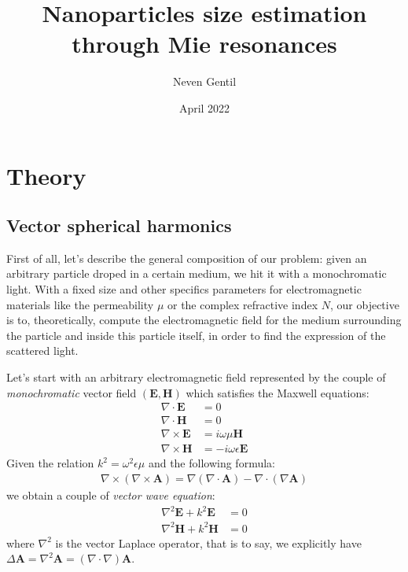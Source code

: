 \documentclass{article}
\title{Nanoparticles size estimation through Mie resonances}
\author{Neven Gentil}
\date{April 2022}
\numberwithin{equation}{section}
\begin{document}
\maketitle

\twocolumn

\section{Theory}

\subsection{Vector spherical harmonics}

First of all, let's describe the general composition of our problem: given an arbitrary particle droped in a certain medium, we hit it with a monochromatic light. With a fixed size and other specifics parameters for electromagnetic materials like the permeability $\mu$ or the complex refractive index $N$, our objective is to, theoretically, compute the electromagnetic field for the medium surrounding the particle and inside this particle itself, in order to find the expression of the scattered light.

Let's start with an arbitrary electromagnetic field represented by the couple of \textit{monochromatic} vector field $(\textbf{E}, \textbf{H})$ which satisfies the Maxwell equations:
\begin{align}
\nabla \cdot \textbf{E} &= 0\\
\nabla \cdot \textbf{H} &= 0\\
\nabla \times \textbf{E} &= i\omega \mu \textbf{H} \label{eq:rot_e} \\
\nabla \times \textbf{H} &= -i\omega \epsilon \textbf{E} \label{eq:rot_h}
\end{align}
Given the relation $k^{2} = \omega ^{2}\epsilon \mu$ and the following formula:
\begin{align}\label{eq:rot_rot_a}
\nabla \times (\nabla \times \textbf{A}) = \nabla (\nabla \cdot \textbf{A}) - \nabla \cdot (\nabla \textbf{A})
\end{align}
we obtain a couple of \textit{vector wave equation}:
\begin{align}
\nabla ^{2} \textbf{E} + k^{2}\textbf{E}&=0\\
\nabla ^{2} \textbf{H} + k^{2}\textbf{H}&=0
\end{align}
where $\nabla ^{2}$ is the vector Laplace operator, that is to say, we explicitly have $\Delta \textbf{A} = \nabla ^{2} \textbf{A} = (\nabla \cdot \nabla) \textbf{A}$.
\end{document}
